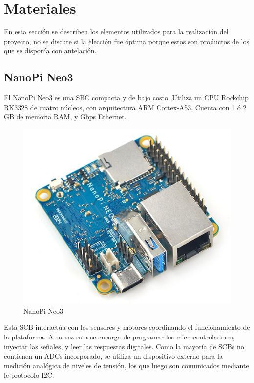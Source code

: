 \documentclass[12pt,letterpaper]{article}     %
\begin{document}
\clearpage
\section{Materiales}

En esta sección se describen los elementos utilizados para la realización del proyecto, no se discute si la
elección fue óptima porque estos son productos de los que se disponía con antelación.

\subsection{NanoPi Neo3}

El NanoPi Neo3 es una SBC compacta y de bajo costo. Utiliza un CPU Rockchip RK3328 de cuatro núcleos, con
arquitectura ARM Cortex-A53. Cuenta con 1 ó 2 GB de memoria RAM, y Gbps Ethernet. 

\begin{figure}[!ht]
\centering
\includegraphics[scale=0.5]{imagenes/naopi.jpg}
\caption{NanoPi Neo3}
\label{fig:nanopi}
\end{figure}

Esta SCB interactúa con los sensores y motores coordinando el funcionamiento de la plataforma.
A su vez esta se encarga de programar los microcontroladores, inyectar las señales, y leer 
las respuestas digitales. Como la mayoría de SCBs no contienen un ADCs incorporado, se utiliza
un dispositivo externo para la medición analógica de niveles de tensión, los que luego son
comunicados mediante le protocolo I2C.
\end{document}
